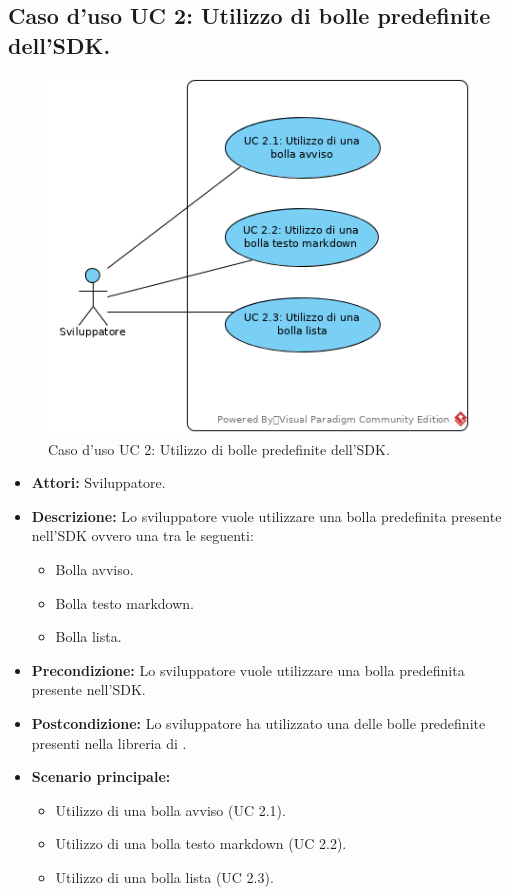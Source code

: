 \subsection{Caso d'uso UC 2: Utilizzo di bolle predefinite dell'SDK.}
\label{Caso d'uso UC 2: Utilizzo di bolle predefinite dell'SDK.}
\begin{figure}[ht]
	\centering
	\includegraphics[scale=0.60]{Usecases/img/UC2.png}
	\caption{Caso d'uso UC 2: Utilizzo di bolle predefinite dell'SDK.}
\end{figure}

\FloatBarrier
\begin{itemize}
\item \textbf{Attori:} Sviluppatore.
\item \textbf{Descrizione:} Lo sviluppatore vuole utilizzare una bolla predefinita presente nell'SDK ovvero una tra le seguenti:
\begin{itemize}
\item Bolla avviso.
\item Bolla testo markdown.
\item Bolla lista.
\end{itemize} 
\item \textbf{Precondizione:} Lo sviluppatore vuole utilizzare una bolla predefinita presente nell'SDK. 
\item \textbf{Postcondizione:} Lo sviluppatore ha utilizzato una delle bolle predefinite presenti nella libreria di \progetto.
\item \textbf{Scenario principale:}
	\begin{itemize}
	\item{Utilizzo di una bolla avviso (UC 2.1).}
	\item{Utilizzo di una bolla testo markdown (UC 2.2).}
	\item{Utilizzo di una bolla lista (UC 2.3).}
	\end{itemize}
\end{itemize}